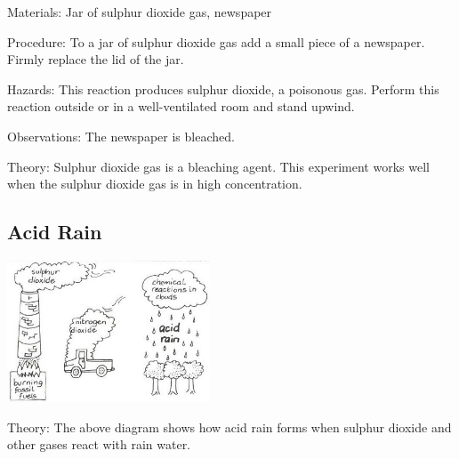 \begin{multicols}{2}
\begin{description*}
\item[Materials:]{Jar of sulphur dioxide gas, newspaper}
\item[Procedure:]{To a jar of sulphur dioxide gas add a small
piece of a newspaper. Firmly replace the lid of
the jar.}
\item[Hazards:]{This reaction produces sulphur dioxide, a poisonous gas. Perform this
reaction outside or in a well-ventilated room and stand upwind.}
\item[Observations:]{The newspaper is bleached.}
\item[Theory:]{Sulphur dioxide gas is a bleaching agent.
This experiment works well when the sulphur
dioxide gas is in high concentration.}
\end{description*}

\subsection{Acid Rain}

\begin{center}
\includegraphics[width=0.45\textwidth]{./img/vso/acid-rain.jpg}
\end{center}

\begin{description*}
\item[Theory:]{The above diagram shows how acid rain
forms when sulphur dioxide and other gases
react with rain water.}
\end{description*}


\end{multicols}
